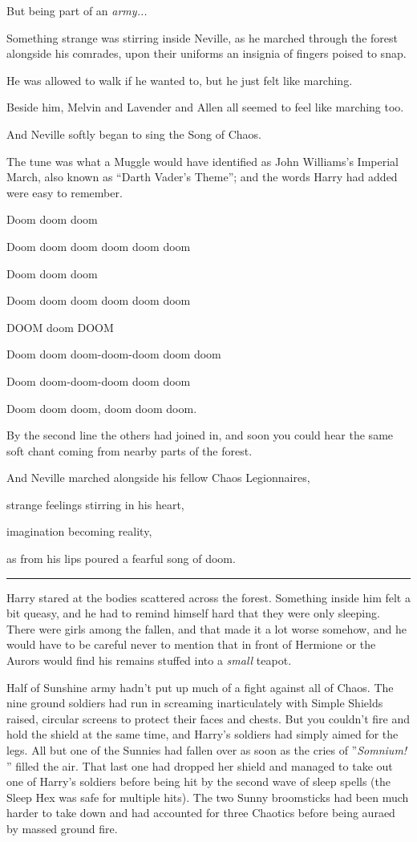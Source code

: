 But being part of an \emph{army...}

Something strange was stirring inside Neville, as he marched through the
forest alongside his comrades, upon their uniforms an insignia of
fingers poised to snap.

He was allowed to walk if he wanted to, but he just felt like marching.

Beside him, Melvin and Lavender and Allen all seemed to feel like
marching too.

And Neville softly began to sing the Song of Chaos.

The tune was what a Muggle would have identified as John Williams's
Imperial March, also known as ``Darth Vader's Theme''; and the words
Harry had added were easy to remember.

Doom doom doom

Doom doom doom doom doom doom

Doom doom doom

Doom doom doom doom doom doom

DOOM doom DOOM

Doom doom doom-doom-doom doom doom

Doom doom-doom-doom doom doom

Doom doom doom, doom doom doom.

By the second line the others had joined in, and soon you could hear the
same soft chant coming from nearby parts of the forest.

And Neville marched alongside his fellow Chaos Legionnaires,

strange feelings stirring in his heart,

imagination becoming reality,

as from his lips poured a fearful song of doom.

\begin{center}\rule{3in}{0.4pt}\end{center}

Harry stared at the bodies scattered across the forest. Something inside
him felt a bit queasy, and he had to remind himself hard that they were
only sleeping. There were girls among the fallen, and that made it a lot
worse somehow, and he would have to be careful never to mention that in
front of Hermione or the Aurors would find his remains stuffed into a
\emph{small} teapot.

Half of Sunshine army hadn't put up much of a fight against all of
Chaos. The nine ground soldiers had run in screaming inarticulately with
Simple Shields raised, circular screens to protect their faces and
chests. But you couldn't fire and hold the shield at the same time, and
Harry's soldiers had simply aimed for the legs. All but one of the
Sunnies had fallen over as soon as the cries of ''\emph{Somnium!} ''
filled the air. That last one had dropped her shield and managed to take
out one of Harry's soldiers before being hit by the second wave of sleep
spells (the Sleep Hex was safe for multiple hits). The two Sunny
broomsticks had been much harder to take down and had accounted for
three Chaotics before being auraed by massed ground fire.

